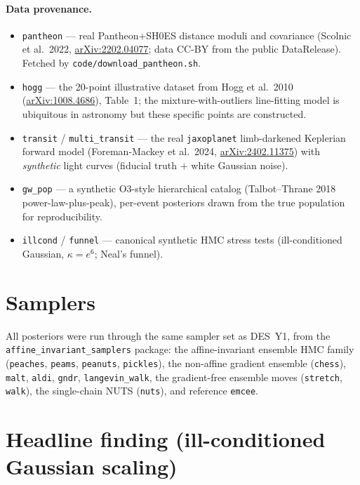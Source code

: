\documentclass[11pt]{article}
\begin{document}
\paragraph{Data provenance.}
\begin{itemize}\setlength\itemsep{2pt}
\item \texttt{pantheon} --- real Pantheon+SH0ES distance moduli and covariance
(Scolnic et al.\ 2022, \href{https://arxiv.org/abs/2202.04077}{arXiv:2202.04077};
data CC-BY from the public DataRelease).  Fetched by
\texttt{code/download\_pantheon.sh}.
\item \texttt{hogg} --- the 20-point illustrative dataset from
Hogg et al.\ 2010 (\href{https://arxiv.org/abs/1008.4686}{arXiv:1008.4686}),
Table~1; the mixture-with-outliers line-fitting model is ubiquitous in
astronomy but these specific points are constructed.
\item \texttt{transit} / \texttt{multi\_transit} --- the real
\texttt{jaxoplanet} limb-darkened Keplerian forward model
(Foreman-Mackey et al.\ 2024,
\href{https://arxiv.org/abs/2402.11375}{arXiv:2402.11375}) with
\emph{synthetic} light curves (fiducial truth $+$ white Gaussian noise).
\item \texttt{gw\_pop} --- a synthetic O3-style hierarchical catalog
(Talbot--Thrane 2018 power-law-plus-peak), per-event posteriors drawn from
the true population for reproducibility.
\item \texttt{illcond} / \texttt{funnel} --- canonical synthetic HMC stress
tests (ill-conditioned Gaussian, $\kappa=e^6$; Neal's funnel).
\end{itemize}

\section{Samplers}

All posteriors were run through the same sampler set as DES~Y1, from the
\texttt{affine\_invariant\_samplers} package: the affine-invariant ensemble
HMC family (\texttt{peaches}, \texttt{peams}, \texttt{peanuts},
\texttt{pickles}), the non-affine gradient ensemble (\texttt{chess}),
\texttt{malt}, \texttt{aldi}, \texttt{gndr}, \texttt{langevin\_walk}, the
gradient-free ensemble moves (\texttt{stretch}, \texttt{walk}), the
single-chain NUTS (\texttt{nuts}), and reference \texttt{emcee}.

\section{Headline finding (ill-conditioned Gaussian scaling)}
\end{document}
